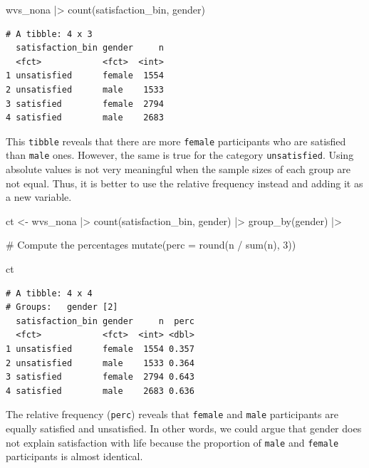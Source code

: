 \documentclass[
  letterpaper,
]{krantz}
\makeatletter
\newenvironment{Shaded}{\begin{snugshade}}{\end{snugshade}}
\newcommand{\AttributeTok}[1]{\textcolor[rgb]{0.40,0.45,0.13}{#1}}
\newcommand{\CommentTok}[1]{\textcolor[rgb]{0.37,0.37,0.37}{#1}}
\newcommand{\DecValTok}[1]{\textcolor[rgb]{0.68,0.00,0.00}{#1}}
\newcommand{\FunctionTok}[1]{\textcolor[rgb]{0.28,0.35,0.67}{#1}}
\newcommand{\NormalTok}[1]{\textcolor[rgb]{0.00,0.23,0.31}{#1}}
\newcommand{\OtherTok}[1]{\textcolor[rgb]{0.00,0.23,0.31}{#1}}
\newcommand{\SpecialCharTok}[1]{\textcolor[rgb]{0.37,0.37,0.37}{#1}}
\newenvironment{kframe}{%
\medskip{}
\setlength{\fboxsep}{.8em}
 \def\at@end@of@kframe{}%
 \ifinner\ifhmode%
  \def\at@end@of@kframe{\end{minipage}}%
  \begin{minipage}{\columnwidth}%
 \fi\fi%
 \def\FrameCommand##1{\hskip\@totalleftmargin \hskip-\fboxsep
 \colorbox{shadecolor}{##1}\hskip-\fboxsep
     \hskip-\linewidth \hskip-\@totalleftmargin \hskip\columnwidth}%
 \MakeFramed {\advance\hsize-\width
   \@totalleftmargin\z@ \linewidth\hsize
   \@setminipage}}%
 {\par\unskip\endMakeFramed%
 \at@end@of@kframe}
\renewenvironment{Shaded}{\begin{kframe}}{\end{kframe}}
\makeatother
\begin{document}
\begin{Shaded}
\begin{Highlighting}[]
\NormalTok{wvs\_nona }\SpecialCharTok{|\textgreater{}} \FunctionTok{count}\NormalTok{(satisfaction\_bin, gender)}
\end{Highlighting}
\end{Shaded}

\begin{verbatim}
# A tibble: 4 x 3
  satisfaction_bin gender     n
  <fct>            <fct>  <int>
1 unsatisfied      female  1554
2 unsatisfied      male    1533
3 satisfied        female  2794
4 satisfied        male    2683
\end{verbatim}

This \texttt{tibble} reveals that there are more \texttt{female}
participants who are satisfied than \texttt{male} ones. However, the
same is true for the category \texttt{unsatisfied}. Using absolute
values is not very meaningful when the sample sizes of each group are
not equal. Thus, it is better to use the relative frequency instead and
adding it as a new variable.

\begin{Shaded}
\begin{Highlighting}[]
\NormalTok{ct }\OtherTok{\textless{}{-}}
\NormalTok{  wvs\_nona }\SpecialCharTok{|\textgreater{}}
  \FunctionTok{count}\NormalTok{(satisfaction\_bin, gender) }\SpecialCharTok{|\textgreater{}}
  \FunctionTok{group\_by}\NormalTok{(gender) }\SpecialCharTok{|\textgreater{}}
  
  \CommentTok{\# Compute the percentages}
  \FunctionTok{mutate}\NormalTok{(}\AttributeTok{perc =} \FunctionTok{round}\NormalTok{(n }\SpecialCharTok{/} \FunctionTok{sum}\NormalTok{(n), }\DecValTok{3}\NormalTok{))}

\NormalTok{ct}
\end{Highlighting}
\end{Shaded}

\begin{verbatim}
# A tibble: 4 x 4
# Groups:   gender [2]
  satisfaction_bin gender     n  perc
  <fct>            <fct>  <int> <dbl>
1 unsatisfied      female  1554 0.357
2 unsatisfied      male    1533 0.364
3 satisfied        female  2794 0.643
4 satisfied        male    2683 0.636
\end{verbatim}

The relative frequency (\texttt{perc}) reveals that \texttt{female} and
\texttt{male} participants are equally satisfied and unsatisfied. In
other words, we could argue that gender does not explain satisfaction
with life because the proportion of \texttt{male} and \texttt{female}
participants is almost identical.
\end{document}

